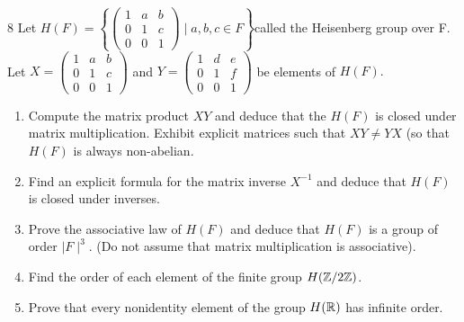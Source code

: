 \documentclass[12pt]{article}
\begin{document}
\newpage

\begin{problem}{8}
    Let $H(F) = \left \{ \begin{pmatrix} 1 & a & b \\ 0 & 1 & c \\ 0 & 0 &1 \end{pmatrix} \mid a,b, c \in F \right \}$\textemdash   called the Heisenberg group over F. Let $X= \begin{pmatrix} 1 & a & b \\ 0 & 1 & c \\0 & 0 & 1 \end{pmatrix}$ and $Y = \begin{pmatrix} 1 & d & e \\ 0 & 1 & f \\ 0 & 0 & 1 \end{pmatrix}$ be elements of $H(F).$

    \begin{enumerate}
        \item Compute the matrix product $XY$ and deduce that the $H(F)$ is closed under matrix multiplication. Exhibit explicit matrices such that $XY \neq YX$ (so that $H(F)$ is always non-abelian.
        \item Find an explicit formula for the matrix inverse $X^{-1}$ and deduce that $H(F)$ is closed under inverses. 
        \item Prove the associative law of $H(F)$ and deduce that $H(F)$ is a group of order $\mid F \mid ^3$. (Do not assume that matrix multiplication is associative). 
        \item Find the order of each element of the finite group $H(\mathbb Z/2\mathbb Z)$.
        \item Prove that every nonidentity element of the group $H(\mathbb R)$ has infinite order.
    \end{enumerate}    
\end{problem}
\end{document}
